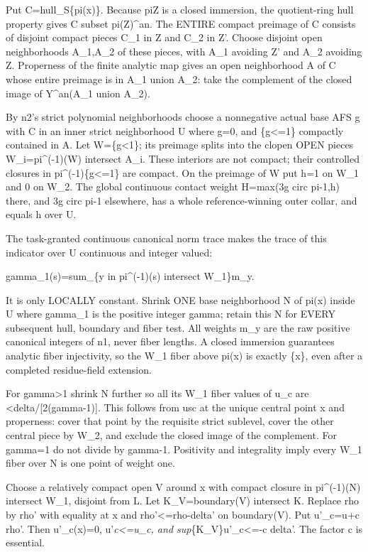 \documentclass[
  10pt,
]{article}
\begin{document}
Put C=hull\_S\{pi(x)\}. Because pi\textbar Z is a closed immersion, the
quotient-ring hull property gives C subset pi(Z)\^{}an. The ENTIRE
compact preimage of C consists of disjoint compact pieces C\_1 in Z and
C\_2 in Z'. Choose disjoint open neighborhoods A\_1,A\_2 of these
pieces, with A\_1 avoiding Z' and A\_2 avoiding Z. Properness of the
finite analytic map gives an open neighborhood A of C whose entire
preimage is in A\_1 union A\_2: take the complement of the closed image
of Y\^{}an(A\_1 union A\_2).

By n2's strict polynomial neighborhoods choose a nonnegative actual base
AFS g with C in an inner strict neighborhood U where g=0, and
\{g\textless=1\} compactly contained in A. Let W=\{g\textless1\}; its
preimage splits into the clopen OPEN pieces W\_i=pi\^{}(-1)(W) intersect
A\_i. These interiors are not compact; their controlled closures in
pi\^{}(-1)\{g\textless=1\} are compact. On the preimage of W put h=1 on
W\_1 and 0 on W\_2. The global continuous contact weight H=max(3g circ
pi-1,h) there, and 3g circ pi-1 elsewhere, has a whole reference-winning
outer collar, and equals h over U.

The task-granted continuous canonical norm trace makes the trace of this
indicator over U continuous and integer valued:

gamma\_1(s)=sum\_\{y in pi\^{}(-1)(s) intersect W\_1\}m\_y.

It is only LOCALLY constant. Shrink ONE base neighborhood N of pi(x)
inside U where gamma\_1 is the positive integer gamma; retain this N for
EVERY subsequent hull, boundary and fiber test. All weights m\_y are the
raw positive canonical integers of n1, never fiber lengths. A closed
immersion guarantees analytic fiber injectivity, so the W\_1 fiber above
pi(x) is exactly \{x\}, even after a completed residue-field extension.

For gamma\textgreater1 shrink N further so all its W\_1 fiber values of
u\_c are \textless delta/{[}2(gamma-1){]}. This follows from usc at the
unique central point x and properness: cover that point by the requisite
strict sublevel, cover the other central piece by W\_2, and exclude the
closed image of the complement. For gamma=1 do not divide by gamma-1.
Positivity and integrality imply every W\_1 fiber over N is one point of
weight one.

Choose a relatively compact open V around x with compact closure in
pi\^{}(-1)(N) intersect W\_1, disjoint from L. Let K\_V=boundary(V)
intersect K. Replace rho by rho' with equality at x and
rho'\textless=rho-delta' on boundary(V). Put u'\_c=u+c rho'. Then
u'\_c(x)=0, u'\emph{c\textless=u\_c, and sup}\{K\_V\}u'\_c\textless=-c
delta'. The factor c is essential.
\end{document}
